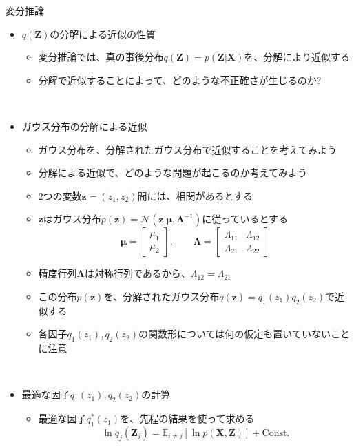\documentclass[dvipdfmx,notheorems,t]{beamer}
\begin{document}
\begin{frame}{変分推論}

\begin{itemize}
	\item $q(\bm{Z})$の分解による近似の性質
	\begin{itemize}
		\item 変分推論では、真の事後分布$q(\bm{Z}) = p(\bm{Z} | \bm{X})$を、分解により近似する
		\item 分解で近似することによって、\alert{どのような不正確さが生じるのか?}
	\end{itemize} \
	
	\item ガウス分布の分解による近似
	\begin{itemize}
		\item ガウス分布を、\alert{分解されたガウス分布}で近似することを考えてみよう
		\item 分解による近似で、どのような問題が起こるのか考えてみよう
		\newline
		\item 2つの変数$\bm{z} = (z_1, z_2)$間には、\alert{相関がある}とする
		\item $\bm{z}$はガウス分布$p(\bm{z}) = \mathcal{N}(\bm{z} | \bm{\mu}, \bm{\Lambda}^{-1})$に従っているとする
		\begin{equation}
			\bm{\mu} = \left[ \begin{array}{l} \mu_1 \\ \mu_2 \end{array} \right], \qquad \bm{\Lambda} = \left[ \begin{array}{ll} \Lambda_{11} & \Lambda_{12} \\ \Lambda_{21} & \Lambda_{22} \end{array} \right]
		\end{equation}
		
		\item 精度行列$\bm{\Lambda}$は対称行列であるから、$\Lambda_{12} = \Lambda_{21}$
		\newline
		\item この分布$p(\bm{z})$を、分解されたガウス分布$q(\bm{z}) = q_1(z_1) q_2(z_2)$で近似する
		\item 各因子$q_1(z_1), q_2(z_2)$の関数形については\alert{何の仮定も置いていない}ことに注意
	\end{itemize} \
	
	\item 最適な因子$q_1(z_1), q_2(z_2)$の計算
	\begin{itemize}
		\item 最適な因子$q_1^*(z_1)$を、先程の結果を使って求める
		\begin{equation}
			\ln q_j(\bm{Z}_j) = \mathbb{E}_{i \neq j}[\ln p(\bm{X}, \bm{Z})] + \mathrm{Const.}
		\end{equation}
		

\end{itemize}
\end{itemize}
\end{frame}
\end{document}
